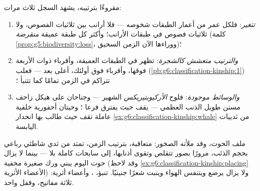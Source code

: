 \begin{proposition}\label{prop:g9:evidence-of-evolution:record}
مقروءًا بترتيبه، يشهد السجل ثلاث مرات:
\begin{enumerate}
  \item \emph{ تتغير}: فلكل عمر من أعمار
        الطبقات شخوصه --- فلا أرانب بين ثلاثيات الفصوص،
        ولا ثلاثيات فصوص في طبقات الأرانب؛ وأكثر 
        كل طبقة عميقة \emph{منقرضة} (كلمة
        \cref{prop:g5:biodiversity:loss}، ووراءها الآن
        الزمن السحيق)؛
  \item \emph{والترتيب متعشش كالشجرة}:  تظهر في
        الطبقات العميقة، وأقرباء  ذوات 
        الأربعة فوقها، وأقرباء  فوق أولئك،
          أعلى بعد --- فعلب 
        (\cref{pb:g6:classification-kinship:1}) تتراكم
        في الزمن تمامًا كما تتنبأ ؛
  \item \emph{والوسائط موجودة}: فلوح
        \emph{الأركيوبتيريكس} الشهير ---  وجناحان على
        هيكل زاحف مسنن طويل الذنب العظمي --- يقف حيث
        يفترق فرعا  ؛ وحيتان أحفورية 
        خلفية عاملة تقف حيث طالب بها انحدار
        \cref{ex:g6:classification-kinship:whale} من
        ثدييات اليابسة.
\end{enumerate}
\end{proposition}
\admitted

\begin{example}\label{ex:g9:evidence-of-evolution:whales}
ملف الحوت، وقد ملأته الصخور:  متعاقبة، بترتيب
الزمن، تمتد من ثدي شاطئي رباعي  بحجم الذئب،
مرورًا بصور تتقلص  وتقوى أذنابها، إلى سابحات كاملة
بلا  --- بينما لا يزال حوت اليوم يبني  ورك 
صغيرة مخفية (وقد لاحظ
\cref{ex:g6:classification-kinship:placing} الأعضاء
الأثرية) ولا يزال يرضع ويتنفس الهواء وينبت شعرًا
جنينيًا. تنبؤ، ، وأعضاء أثرية: ثلاثة مفاتيح، وقفل
واحد.
\end{example}

